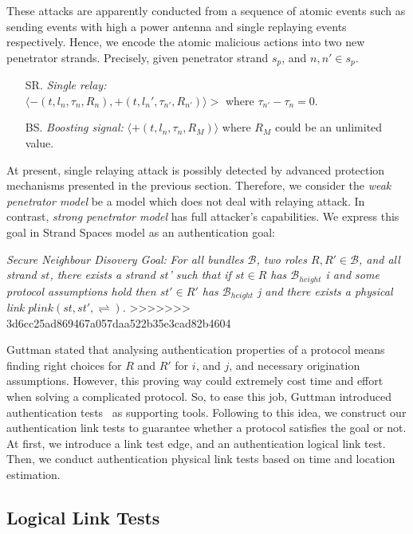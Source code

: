 \begin{flushleft}
\begin{flushleft}
\begin{Definition}
\begin{itemize}
These attacks are apparently conducted from a sequence of atomic events such as sending events with high a power antenna  and single replaying events respectively. Hence, we encode the atomic malicious actions into two new penetrator strands. Precisely, given penetrator strand $s_p$, and $n, n' \in s_p$. 
\begin{itemize}
\item[SR.] \emph{Single relay:} \\ $\langle -(t, l_n, \tau_{n}, R_n), +(t, l_n', \tau_{n'}, R_{n'}) \rangle >$ where $\tau_{n'} - \tau_{n} = 0$.
\item [BS.] \emph{Boosting signal:} $\langle +(t, l_n, \tau_{n}, R_M) \rangle$ where $R_M$ could be an unlimited value. 
\end{itemize}

At present, single relaying attack is possibly detected by advanced protection mechanisms presented in the previous section. Therefore, we consider the \emph{weak penetrator model} be a model which does not deal with relaying attack. In contrast, \emph{strong penetrator model} has full attacker's capabilities. 
We express this goal in Strand Spaces model as an authentication goal:

\emph{Secure Neighbour Disovery Goal:} \textit{For all bundles $\mathcal{B}$, two roles $R, R' \in \mathcal{B}$, and all strand $st$, there exists a strand $st$' such that if $st \in R$ has $ \mathcal{B}_{height}$ i and some protocol assumptions hold then $st' \in R'$ has $\mathcal{B}_{height}$ j and there exists a physical link $plink(st,st',\rightleftharpoons)$.}
>>>>>>> 3d6cc25ad869467a057daa522b35e3cad82b4604

Guttman stated that analysing authentication properties of a protocol means finding right choices for $R$ and $R'$ for $i$, and $j$, and necessary origination assumptions. However, this proving way could extremely cost time and effort when solving a complicated protocol. So, to ease this job, Guttman introduced authentication tests~\cite{authenticationtests} as supporting tools. Following to this idea, we construct our authentication link tests to guarantee whether a protocol satisfies the goal or not.  At first, we introduce a link test edge, and an authentication logical link test. Then, we conduct authentication physical link tests based on time and location estimation. 

\subsection{Logical Link Tests}


\end{itemize}
\end{Definition}
\end{flushleft}
\end{flushleft}
